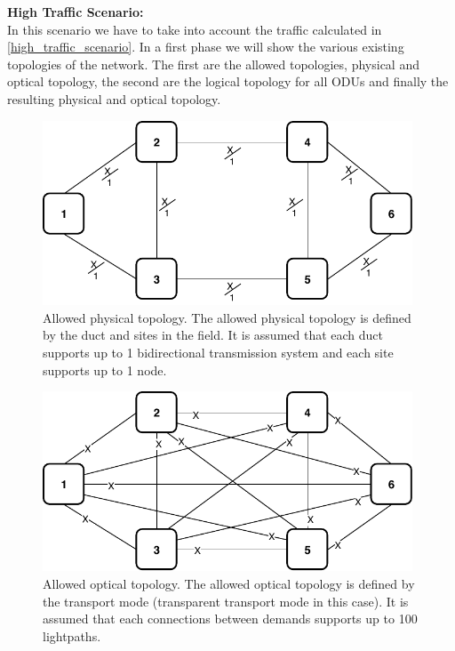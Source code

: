 \vspace{13pt}
\textbf{High Traffic Scenario:}\\

In this scenario we have to take into account the traffic calculated in \ref{high_traffic_scenario}. In a first phase we will show the various existing topologies of the network. The first are the allowed topologies, physical and optical topology, the second are the logical topology for all ODUs and finally the resulting physical and optical topology.

\begin{figure}[h!]
\centering
\includegraphics[width=11cm]{sdf/ilp/transparent_protection/figures/allowed_physical_topology}
\caption{Allowed physical topology. The allowed physical topology is defined by the duct and sites in the field. It is assumed that each duct supports up to 1 bidirectional transmission system and each site supports up to 1 node.}
\label{allowed2_physical_protectionhigh}
\end{figure}

\newpage
\begin{figure}[h!]
\centering
\includegraphics[width=11cm]{sdf/ilp/transparent_protection/figures/allowed_optical_topology}
\caption{Allowed optical topology. The allowed optical topology is defined by the transport mode (transparent transport mode in this case). It is assumed that each connections between demands supports up to 100 lightpaths.}
\label{allowed2_optical_protectionhigh}
\end{figure}

